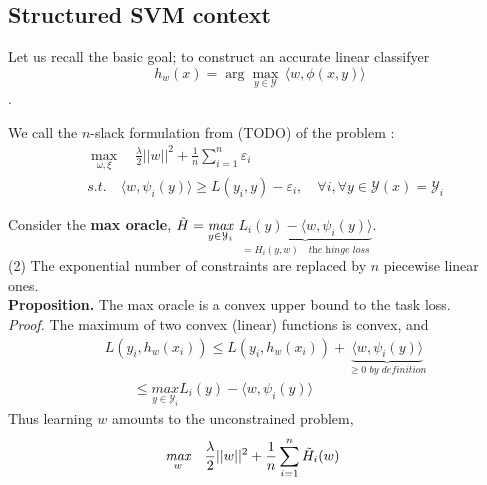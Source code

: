 \subsection{Structured SVM context}
Let us recall the basic goal; to construct an accurate linear classifyer
\begin{equation}
  h_{w}(x)= \arg\max_{y\in \mathcal Y} \, \langle w, \phi(x,y)\rangle
\end{equation}.


We call the $n$-slack formulation from (TODO) of the problem :
\begin{align}
    &\max_{\omega, \xi}\quad\frac{\lambda}{2}||w||^{2}+ \frac{1}{n}\sum_{i=1}^{n}\varepsilon_{i}\\
    &\textit{s.t.}\quad \langle w, \psi_{i}(y)\rangle \geq L(y_{i},y)-
\varepsilon_{i},\quad\forall i ,\forall y\in\mathcal{Y}(x)=\mathcal{Y}_{i}
\end{align}

Consider the \textbf{max oracle}, $\Tilde{H}=
\underset{y\in\mathcal{Y}_{i}}{\textit{max}}$ $\underbrace{L_{i}(y)- \langle w,
\psi_{i}(y)\rangle}_{= H_{i}(y,w)\quad\textit{the hinge loss}}$.\\ (2) The
exponential number of constraints are replaced by $n$ piecewise linear ones. \\

\textbf{Proposition.} The max oracle is a convex upper bound to the task loss.\\
\textit{Proof.} The maximum of two convex (linear) functions is convex, and
\begin{equation*}
\begin{aligned}
    &L(y_{i},h_{w}(x_{i})) \leq L(y_{i},h_{w}(x_{i})) + \underbrace{\langle w, \psi_{i}(y)\rangle}_{\geq 0 \textit{ by definition}} \\
    &\quad\quad\leq \underset{y\in\mathcal{Y}_{i}}{\textit{max}} L_{i}(y)- \langle w, \psi_{i}(y)\rangle
\end{aligned}
\end{equation*}
Thus learning $w$ amounts to the unconstrained problem,
\begin{equation*}
\begin{aligned}
    &\underset{w}{\textit{max}}\quad\frac{\lambda}{2}||w||^{2}+ \frac{1}{n}\sum_{i=1}^{n}\Tilde{H}_{i}(w)
\end{aligned}
\end{equation*}

